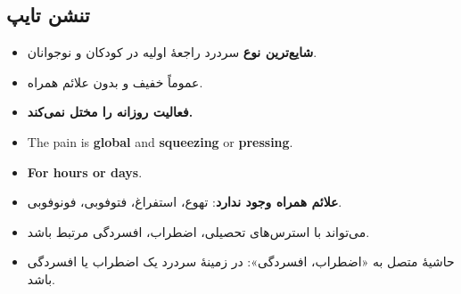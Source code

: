 \documentclass[11pt,a4paper]{article}
\providecommand{\en}[1]{\lr{#1}}
\newcommand{\HMfooter}[1]{\par\medskip{\footnotesize\noindent\en{YASHA}\hfill #1\par}}
\begin{document}
\subsection*{تنشن تایپ}
\begin{itemize}
  \item \textbf{شایع‌ترین نوع} سردرد راجعهٔ اولیه در کودکان و نوجوانان.
  \item عموماً خفیف و بدون علائم همراه.
  \item \textbf{فعالیت روزانه را مختل نمی‌کند.}
\end{itemize}
\begin{latin}
\begin{itemize}
  \item The pain is \textbf{global} and \textbf{squeezing} or \textbf{pressing}.
  \item \textbf{For hours or days}.
\end{itemize}
\end{latin}
\begin{itemize}
  \item \textbf{علائم همراه وجود ندارد}: تهوع، استفراغ، فتوفوبی، فونوفوبی.
  \item می‌تواند با استرس‌های تحصیلی، اضطراب، افسردگی مرتبط باشد.
  \item حاشیهٔ متصل به «اضطراب، افسردگی»: در زمینهٔ سردرد یک اضطراب یا افسردگی باشد.
\end{itemize}
\HMfooter{۱}
\end{document}
